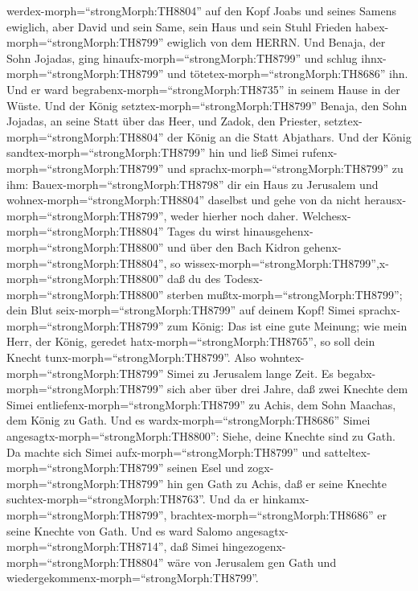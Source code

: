 werdex-morph=``strongMorph:TH8804'' auf den Kopf Joabs und seines Samens
ewiglich, aber David und sein Same, sein Haus und sein Stuhl Frieden
habex-morph=``strongMorph:TH8799'' ewiglich von dem HERRN. 
Und Benaja, der Sohn Jojadas, ging hinaufx-morph=``strongMorph:TH8799''
und schlug ihnx-morph=``strongMorph:TH8799'' und
tötetex-morph=``strongMorph:TH8686'' ihn. Und er ward
begrabenx-morph=``strongMorph:TH8735'' in seinem Hause in der Wüste.
 Und der König setztex-morph=``strongMorph:TH8799'' Benaja,
den Sohn Jojadas, an seine Statt über das Heer, und Zadok, den Priester,
setztex-morph=``strongMorph:TH8804'' der König an die Statt Abjathars.
 Und der König sandtex-morph=``strongMorph:TH8799'' hin und
ließ Simei rufenx-morph=``strongMorph:TH8799'' und
sprachx-morph=``strongMorph:TH8799'' zu ihm:
Bauex-morph=``strongMorph:TH8798'' dir ein Haus zu Jerusalem und
wohnex-morph=``strongMorph:TH8804'' daselbst und gehe von da nicht
herausx-morph=``strongMorph:TH8799'', weder hierher noch daher.
 Welchesx-morph=``strongMorph:TH8804'' Tages du wirst
hinausgehenx-morph=``strongMorph:TH8800'' und über den Bach Kidron
gehenx-morph=``strongMorph:TH8804'', so
wissex-morph=``strongMorph:TH8799'',x-morph=``strongMorph:TH8800'' daß
du des Todesx-morph=``strongMorph:TH8800'' sterben
mußtx-morph=``strongMorph:TH8799''; dein Blut
seix-morph=``strongMorph:TH8799'' auf deinem Kopf!  Simei
sprachx-morph=``strongMorph:TH8799'' zum König: Das ist eine gute
Meinung; wie mein Herr, der König, geredet
hatx-morph=``strongMorph:TH8765'', so soll dein Knecht
tunx-morph=``strongMorph:TH8799''. Also
wohntex-morph=``strongMorph:TH8799'' Simei zu Jerusalem lange Zeit.
 Es begabx-morph=``strongMorph:TH8799'' sich aber über drei
Jahre, daß zwei Knechte dem Simei
entliefenx-morph=``strongMorph:TH8799'' zu Achis, dem Sohn Maachas, dem
König zu Gath. Und es wardx-morph=``strongMorph:TH8686'' Simei
angesagtx-morph=``strongMorph:TH8800'': Siehe, deine Knechte sind zu
Gath.  Da machte sich Simei
aufx-morph=``strongMorph:TH8799'' und
satteltex-morph=``strongMorph:TH8799'' seinen Esel und
zogx-morph=``strongMorph:TH8799'' hin gen Gath zu Achis, daß er seine
Knechte suchtex-morph=``strongMorph:TH8763''. Und da er
hinkamx-morph=``strongMorph:TH8799'',
brachtex-morph=``strongMorph:TH8686'' er seine Knechte von Gath.
 Und es ward Salomo angesagtx-morph=``strongMorph:TH8714'',
daß Simei hingezogenx-morph=``strongMorph:TH8804'' wäre von Jerusalem
gen Gath und wiedergekommenx-morph=``strongMorph:TH8799''. 
